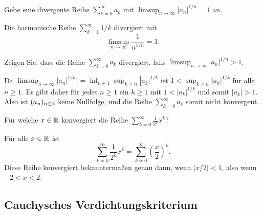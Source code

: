 \documentclass[a4paper,10pt]{article}
\begin{document}
\begin{question}
 Gebe eine divergente Reihe $\sum_{k=0}^\infty a_k$ mit $\limsup_{n \to \infty} |a_n|^{1/n} = 1$ an.
\end{question}
\begin{solution}
 Die harmonische Reihe $\sum_{k=1}^\infty 1/k$ divergiert mit
 \[
  \limsup_{n \to \infty} \frac{1}{n^{1/n}} = 1.
 \]
\end{solution}


\begin{question}
 Zeigen Sie, dass die Reihe $\sum_{k=0}^\infty a_k$ divergiert, falls $\limsup_{n \to \infty} |a_n|^{1/n} > 1$.
\end{question}
\begin{solution}
 Da $\limsup_{n \to \infty} |a_n|^{1/n}| = \inf_{n \in 1} \sup_{k \geq n} |a_k|^{1/k}$ ist $1 < \sup_{k \geq n} |a_k|^{1/k}$ für alle $n \geq 1$. Es gibt daher für jedes $n \geq 1$ ein $k \geq 1$ mit $1 < |a_k|^{1/k}$ und somit $|a_k| > 1$. Also ist $(a_n)_{n \in \mathbb{N}}$ keine Nullfolge, und die Reihe $\sum_{k=0}^\infty a_k$ somit nicht konvergent.
\end{solution}


\begin{question}
 Für welche $x \in \mathbb{R}$ konvergiert die Reihe $\sum_{k=0}^\infty \frac{1}{2^k} x^k$?
\end{question}
\begin{solution}
 Für alle $x \in \mathbb{R}$ ist
 \[
  \sum_{k=0}^\infty \frac{1}{2^k} x^k
  = \sum_{k=0}^\infty \left(\frac{x}{2}\right)^k.
 \]
 Diese Reihe konvergiert bekanntermaßen genau dann, wenn $|x/2| < 1$, also wenn $-2 < x < 2$.
\end{solution}





\subsection{Cauchysches Verdichtungskriterium}
\end{document}
